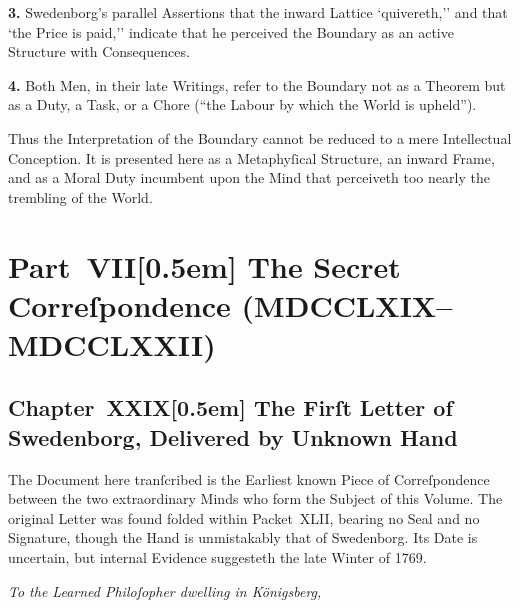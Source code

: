 \documentclass[12pt]{book}
\begin{document}
\medskip

\noindent\textbf{3.} Swedenborg’s parallel Assertions that the inward Lattice `quivereth,'' and that `the Price is paid,'' indicate that he perceived the Boundary as an active Structure with Consequences.

\medskip

\noindent\textbf{4.} Both Men, in their late Writings, refer to the Boundary not as a Theorem but as a Duty, a Task, or a Chore (``the Labour by which the World is upheld'').

\medskip

\noindent Thus the Interpretation of the Boundary cannot be reduced to a mere Intellectual Conception. It is presented here as a Metaphyſical Structure, an inward Frame, and as a Moral Duty incumbent upon the Mind that perceiveth too nearly the trembling of the World.

\newpage
\part*{Part~VII[0.5em]
The Secret Correſpondence (MDCCLXIX–MDCCLXXII)}



\chapter*{Chapter~XXIX[0.5em]
The Firſt Letter of Swedenborg, Delivered by Unknown Hand}


The Document here tranſcribed is the Earliest known Piece of Correſpondence between the two extraordinary Minds who form the Subject of this Volume. The original Letter was found folded within Packet~XLII, bearing no Seal and no Signature, though the Hand is unmistakably that of Swedenborg. Its Date is uncertain, but internal Evidence suggesteth the late Winter of 1769.

\medskip

\noindent\textit{To the Learned Philoſopher dwelling in Königsberg,}
\end{document}
